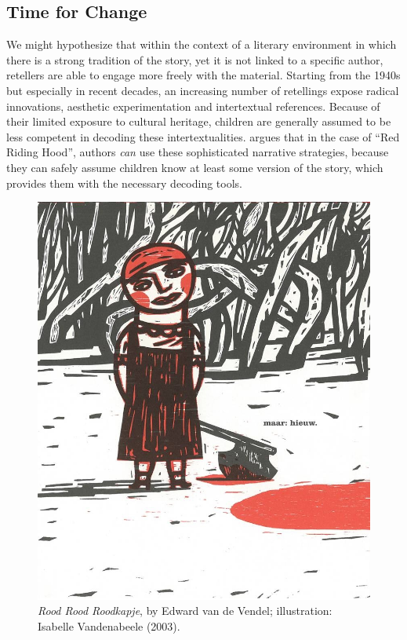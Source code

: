 \subsection{Time for Change}
We might hypothesize that within the context of a literary environment in which there is a strong tradition of the story, yet it is not linked to a specific author, retellers are able to engage more freely with the material\autocite{beckett:2002}. Starting from the 1940s but especially in recent decades, an increasing number of retellings expose radical innovations, aesthetic experimentation and intertextual references. Because of their limited exposure to cultural heritage, children are generally assumed to be less competent in decoding these intertextualities. \citeauthor{beckett:2002} argues that in the case of ``Red Riding Hood'', authors \emph{can} use these sophisticated narrative strategies, because they can safely assume children know at least some version of the story, which provides them with the necessary decoding tools\autocite{beckett:2002}.

\begin{figure}
    \centering
    \includegraphics[width=\textwidth]{images/vendel_wolfdood}
    \caption{\emph{Rood Rood Roodkapje}, by Edward van de Vendel; illustration: Isabelle Vandenabeele (2003).}
    \label{fig:red-red}
\end{figure}

